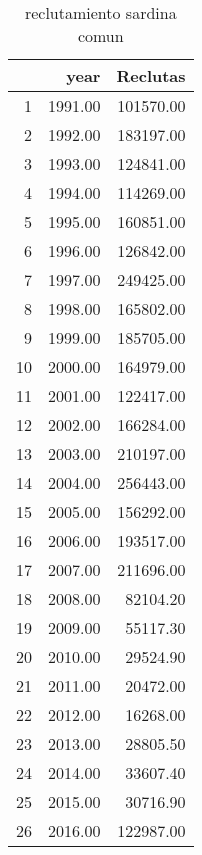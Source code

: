 \begin{table}[ht]
\centering
\caption{reclutamiento sardina comun} 
\label{Tabla1}
\begin{tabular}{rrr}
  \hline
 & year & Reclutas \\ 
  \hline
1 & 1991.00 & 101570.00 \\ 
  2 & 1992.00 & 183197.00 \\ 
  3 & 1993.00 & 124841.00 \\ 
  4 & 1994.00 & 114269.00 \\ 
  5 & 1995.00 & 160851.00 \\ 
  6 & 1996.00 & 126842.00 \\ 
  7 & 1997.00 & 249425.00 \\ 
  8 & 1998.00 & 165802.00 \\ 
  9 & 1999.00 & 185705.00 \\ 
  10 & 2000.00 & 164979.00 \\ 
  11 & 2001.00 & 122417.00 \\ 
  12 & 2002.00 & 166284.00 \\ 
  13 & 2003.00 & 210197.00 \\ 
  14 & 2004.00 & 256443.00 \\ 
  15 & 2005.00 & 156292.00 \\ 
  16 & 2006.00 & 193517.00 \\ 
  17 & 2007.00 & 211696.00 \\ 
  18 & 2008.00 & 82104.20 \\ 
  19 & 2009.00 & 55117.30 \\ 
  20 & 2010.00 & 29524.90 \\ 
  21 & 2011.00 & 20472.00 \\ 
  22 & 2012.00 & 16268.00 \\ 
  23 & 2013.00 & 28805.50 \\ 
  24 & 2014.00 & 33607.40 \\ 
  25 & 2015.00 & 30716.90 \\ 
  26 & 2016.00 & 122987.00 \\ 
   \hline
\end{tabular}
\end{table}
